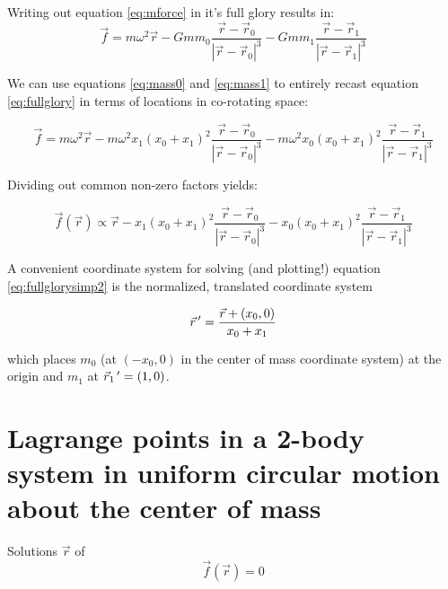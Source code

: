 \documentclass[twoside,11pt]{article}
\begin{document}
Writing out equation \eqref{eq:mforce} in it's full glory results in:
\begin{equation}
\vec{f} = m \omega^2 \vec{r} - G m m_0 \frac{\vec{r}-\vec{r}_0}{\left|\vec{r}-\vec{r}_0\right|^3} - G m m_1 \frac{\vec{r}-\vec{r}_1}{\left|\vec{r}-\vec{r}_1\right|^3} \label{eq:fullglory}
\end{equation}

We can use equations \eqref{eq:mass0} and \eqref{eq:mass1} to entirely recast equation \eqref{eq:fullglory} in terms of locations in co-rotating space:

\begin{equation}
\vec{f} = m \omega^2 \vec{r} - m \omega^2 x_1 \left( x_0 + x_1 \right)^2 \frac{\vec{r}-\vec{r}_0}{\left|\vec{r}-\vec{r}_0\right|^3} - m \omega^2 x_0 \left( x_0 + x_1 \right)^2 \frac{\vec{r}-\vec{r}_1}{\left|\vec{r}-\vec{r}_1\right|^3} \label{eq:fullglorysimp1}
\end{equation}

Dividing out common non-zero factors yields:

\begin{equation}
\vec{f}\left(\vec{r}\right) \propto \vec{r} - x_1 \left( x_0 + x_1 \right)^2 \frac{\vec{r}-\vec{r}_0}{\left|\vec{r}-\vec{r}_0\right|^3} - x_0 \left( x_0 + x_1 \right)^2 \frac{\vec{r}-\vec{r}_1}{\left|\vec{r}-\vec{r}_1\right|^3} \label{eq:fullglorysimp2}
\end{equation}

A convenient coordinate system for solving (and plotting!) equation \eqref{eq:fullglorysimp2} is the normalized, translated coordinate system

\begin{equation}
\vec{r}\thinspace' = \frac{\vec{r}+\left(x_0,0\right)}{x_0 + x_1} \label{eq:normcoordsys}
\end{equation}

which places $m_0$ (at $(-x_0,0)$ in the center of mass coordinate system) at the origin and $m_1$ at ${\vec{r}}_{1}\thinspace' = \left(1,0\right)$.

\section{Lagrange points in a 2-body system in uniform circular motion about the center of mass}

Solutions $\vec{r}$ of 
\begin{equation}
\vec{f}\left(\vec{r}\right) = 0 \label{eq:forcesolutions}
\end{equation}
\end{document}
